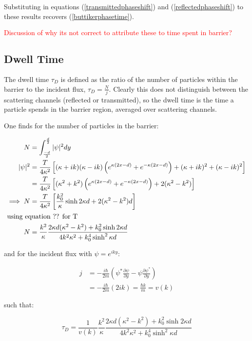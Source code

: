 \documentclass{article}
\begin{document}
\noindent Substituting in equations (\ref{transmittedphaseshift}) and (\ref{reflectedphaseshift}) to these results recovers (\ref{buttikerphasetime}).

\textcolor{red}{Discussion of why its not correct to attribute these to time spent in barrier?}

\subsection{Dwell Time}

The dwell time $\tau_D$ is defined as the ratio of the number of particles within the barrier to the incident flux, $\tau_D = \frac{N}{j}$. Clearly this does not distinguish between the scattering channels (reflected or transmitted), so the dwell time is the time a particle spends in the barrier region, averaged over scattering channels.

\noindent One finds for the number of particles in the barrier:

\begin{align}
	N&=\int_{\frac{-d}{2}}^{\frac{d}{2}}|\psi|^2dy \\
	|\psi|^2 &= \frac{T}{4\kappa^2}\left[(\kappa+ik)(\kappa-ik)\left(e^{\kappa(2x-d)}+e^{-\kappa(2x-d)}\right)+(\kappa+ik)^2+(\kappa-ik)^2\right] \\
		 &= \frac{T}{4\kappa^2}\left[(\kappa^2+k^2)\left(e^{\kappa(2x-d)}+e^{-\kappa(2x-d)}\right)+2(\kappa^2-k^2)\right] \\
	\implies N &= \frac{T}{4\kappa^2}\left[\frac{k_0^2}{\kappa}\sinh{2\kappa d}+2(\kappa^2-k^2)d\right] \\ \intertext{using equation ?? for T}
		 N &= \frac{k^2}{\kappa}\frac{2\kappa d(\kappa^2-k^2)+k_0^2\sinh{2\kappa d}}{4k^2\kappa^2+k_0^4\sinh^2{\kappa d}}
\end{align}

\noindent and for the incident flux with $\psi = e^{iky}$:

\begin{align}
	j &= -\frac{i\hbar}{2m}\left(\psi^{*}\frac{\partial\psi}{\partial y}-\psi \frac{\partial \psi^{*}}{\partial y}\right) \\ 
	&= -\frac{i\hbar}{2m}(2ik) = \frac{\hbar k}{m} = v(k)
\end{align}

\noindent such that:

\begin{equation}
	\tau_D = \frac{1}{v(k)}\frac{k^2}{\kappa}\frac{2\kappa d(\kappa^2-k^2)+k_0^2\sinh{2\kappa d}}{4k^2\kappa^2+k_0^4\sinh^2{\kappa d}}
	\label{dwelltime}
\end{equation}
\end{document}
